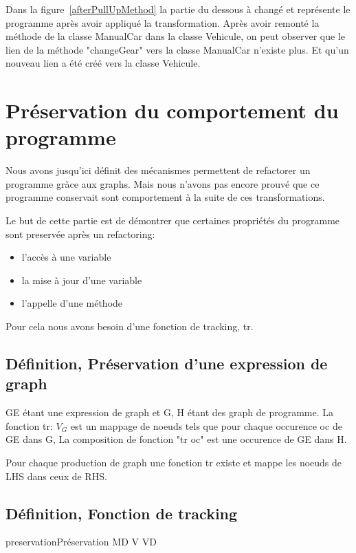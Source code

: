 \documentclass[a4paper, 12pt]{article}
\begin{document}
\begin{enumerate}
Dans la figure~\ref{afterPullUpMethod} la partie du dessous à changé et représente le programme après avoir appliqué la transformation.
Après avoir remonté la méthode de la classe ManualCar dans la classe Vehicule, on peut observer que le lien de la méthode "changeGear" vers la classe ManualCar n'existe plus. Et qu'un nouveau lien a été créé vers la classe Vehicule.

\section{Préservation du comportement du programme}

Nous avons jusqu'ici définit des mécanismes permettent de refactorer un programme gràce aux graphs. Mais nous n'avons pas encore prouvé que ce programme conservait sont comportement à la suite de ces transformations.

Le but de cette partie est de démontrer que certaines propriétés du programme sont preservée après un refactoring:
\begin{itemize}[label=\textbullet]
\item l'accès à une variable
\item la mise à jour d'une variable
\item l'appelle d'une méthode
\end{itemize}

Pour cela nous avons besoin d'une fonction de tracking, tr.

\subsection{Définition, Préservation d'une expression de graph}
GE étant une expression de graph et G, H étant des graph de programme. La fonction tr: {$V_G$}  est un mappage de noeuds tels que pour chaque occurence oc de GE dans G, La composition de fonction "tr \circ oc" est une occurence de GE dans H.

Pour chaque production de graph une fonction tr existe et mappe les noeuds de LHS dans ceux de RHS.

\subsection{Définition, Fonction de tracking}

\begin{myfig}{preservation}{Préservation}
MD   V  VD
\end{myfig}


\end{enumerate}
\end{document}
